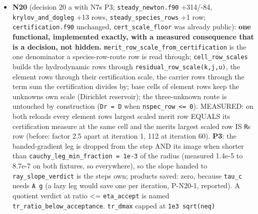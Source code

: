\documentclass[english,a4paper]{my_memo}
\begin{document}
\begin{itemize}
  with both channels live (atomic \texttt{hydrostatic\_column} had the base-face
  channel alone). \texttt{wasp\_full\_newton} not run (no restore unless an attempt
  is refused; whether it has zero refusals was not measured). The reload
  route does not share the rebuild (checked). Advisor: two \texttt{Per-cell}
  phrases in \texttt{caloric\_eos.f90} reworded. \textbf{Reported, not fixed}: the same
  composition-before-pressure ordering stands at three other sites of
  \texttt{EXHALE\_main.f90} (1075-1078, 5162-5166, 5312-5326) and
  \texttt{upmap\_bc\_roundtrip} measures an identity its comment says is not one
  (N16e); the added \texttt{Apply\_BC} adds one boundary evaluation per restore to
  the run-total diagnostic counters.
\item
  \textbf{N20} (decision 20 a with N7\textquotesingle s P3; \texttt{steady\_newton.f90} +314/-84,
  \texttt{krylov\_and\_dogleg} +13 rows, \texttt{steady\_species\_rows} +1 row;
  \texttt{certification.f90} unchanged, \texttt{cert\_scale\_floor} was already public):
  \textbf{one functional, implemented exactly, with a measured consequence that
  is a decision, not hidden.} \texttt{merit\_row\_scale\_from\_certification} is the
  one denominator a species-row-route row is read through; \texttt{cell\_row\_scales}
  builds the hydrodynamic rows through \texttt{residual\_row\_scale(k,j,u)}, the
  element rows through their certification scale, the carrier rows through
  the term sum the certification divides by; base cells of element rows
  keep the unknown\textquotesingle s own scale (Dirichlet reservoir); the three-unknown
  route is untouched by construction (\texttt{Dr\ =\ D} when \texttt{nspec\_row\ \textless{}=\ 0}).
  MEASURED: on both reloads every element row\textquotesingle s largest scaled merit row
  EQUALS its certification measure at the same cell and the merit\textquotesingle s largest
  scaled row IS \texttt{\textbar{}\textbar{}R\textbar{}\textbar{}}\textquotesingle s row (before: factor 2.5 apart at iteration 1, 112
  at iteration 60). \textbf{P3}: the banded-gradient leg is dropped from the
  step AND its image when shorter than \texttt{cauchy\_leg\_min\_fraction\ =\ 1e-3} of
  the radius (measured 1.4e-5 to 8.7e-7 on both fixtures, so everywhere),
  so the slope handed to \texttt{ray\_slope\_verdict} is the step\textquotesingle s own; products
  saved: zero, because \texttt{tau\_c} needs \texttt{A\ g} (a lazy leg would save one per
  iteration, P-N20-1, reported). A quotient verdict at ratio \textless= \texttt{eta\_accept}
  is named \texttt{tr\_ratio\_below\_acceptance}. \texttt{tr\_dmax} capped at \texttt{1e3\ sqrt(neq)}

\end{itemize}
\end{document}
